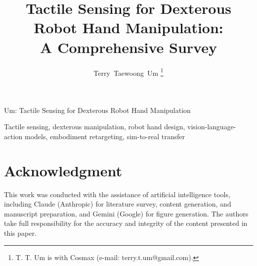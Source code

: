 \documentclass[journal]{IEEEtran}
\begin{document}
\title{Tactile Sensing for Dexterous Robot Hand Manipulation:\\A Comprehensive Survey}

\author{Terry~Taewoong~Um
\thanks{T. T. Um is with Cosmax (e-mail: terry.t.um@gmail.com).}}

%
{Um: Tactile Sensing for Dexterous Robot Hand Manipulation}

\maketitle



\begin{IEEEkeywords}
Tactile sensing, dexterous manipulation, robot hand design, vision-language-action models, embodiment retargeting, sim-to-real transfer
\end{IEEEkeywords}












\section*{Acknowledgment}
This work was conducted with the assistance of artificial intelligence tools, including Claude (Anthropic) for literature survey, content generation, and manuscript preparation, and Gemini (Google) for figure generation. The authors take full responsibility for the accuracy and integrity of the content presented in this paper.



\end{document}
